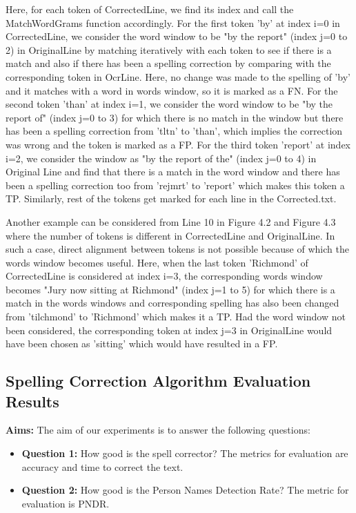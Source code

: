 \documentclass[letterpaper,11pt]{report}
\begin{document}
Here, for each token of CorrectedLine, we find its index and call the MatchWordGrams function accordingly. For the first token 'by' at index i=0 in CorrectedLine, we consider the word window to be "by the report" (index j=0 to 2) in OriginalLine by matching iteratively with each token to see if there is a match and also if there has been a spelling correction by comparing with the corresponding token in OcrLine. Here, no change was made to the spelling of 'by' and it matches with a word in words window, so it is marked as a FN. For the second token 'than' at index i=1, we consider the word window to be "by the report of" (index j=0 to 3) for which there is no match in the window but there has been a spelling correction from 'tltn' to 'than', which implies the correction was wrong and the token is marked as a FP. For the third token 'report' at index i=2, we consider the window as "by the report of the" (index j=0 to 4) in Original Line and find that there is a match in the word window and there has been a spelling correction too from 'rejmrt' to 'report' which makes this token a TP. Similarly, rest of the tokens get marked for each line in the Corrected.txt. 

Another example can be considered from Line 10 in Figure 4.2 and Figure 4.3 where the number of tokens is different in CorrectedLine and OriginalLine. In such a case, direct alignment between tokens is not possible because of which the words window becomes useful. Here, when the last token 'Richmond' of CorrectedLine is considered at index i=3, the corresponding words window becomes "Jury now sitting at Richmond" (index j=1 to 5) for which there is a match in the words windows and corresponding spelling has also been changed from 'tilchmond' to 'Richmond' which makes it a TP. Had the word window not been considered, the corresponding token at index j=3 in OriginalLine would have been chosen as 'sitting' which would have resulted in a FP. 
   


\subsection{Spelling Correction Algorithm Evaluation Results}
\label{spell:eval}

\noindent \textbf{Aims: }The aim of our experiments is to answer the following questions:
\begin{itemize}
\item \textbf{Question 1: }How good is the spell corrector? The metrics for evaluation are accuracy and time to correct the text.
 
\item \textbf{Question 2: }How good is the Person Names Detection Rate? The metric for evaluation is PNDR. 

\end{itemize}
\end{document}
